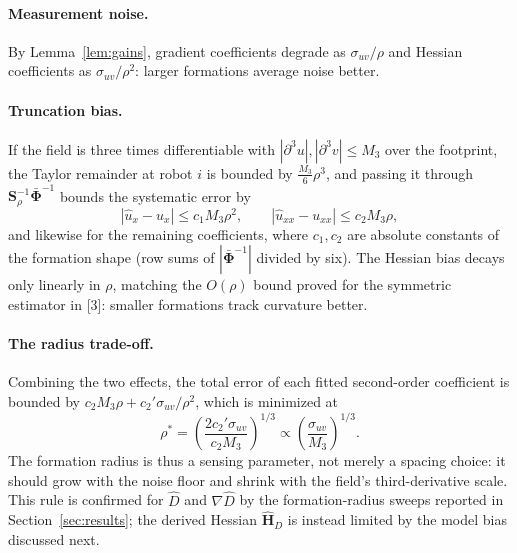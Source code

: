 \documentclass[12pt, letterpaper, oneside]{report}
\begin{document}
\paragraph{Measurement noise.} By Lemma~\ref{lem:gains}, gradient
coefficients degrade as $\sigma_{uv}/\rho$ and Hessian coefficients as
$\sigma_{uv}/\rho^2$: larger formations average noise better.

\paragraph{Truncation bias.} If the field is three times differentiable
with $|\partial^3u|,|\partial^3v|\leq M_3$ over the footprint, the Taylor
remainder at robot $i$ is bounded by $\tfrac{M_3}{6}\rho^3$, and passing it
through $\mathbf{S}_\rho^{-1}\bar{\boldsymbol{\Phi}}^{-1}$ bounds the
systematic error by
\begin{equation}
|\hat u_x - u_x| \leq c_1M_3\rho^2, \qquad |\hat u_{xx}-u_{xx}| \leq c_2M_3\rho,
\label{eq:truncation}
\end{equation}
and likewise for the remaining coefficients, where $c_1,c_2$ are absolute
constants of the formation shape (row sums of $|\bar{\boldsymbol{\Phi}}^{-1}|$
divided by six). The Hessian bias decays only linearly in $\rho$, matching
the $O(\rho)$ bound proved for the symmetric estimator in [3]: smaller
formations track curvature better.

\paragraph{The radius trade-off.} Combining the two effects, the total
error of each fitted second-order coefficient is bounded by
$c_2M_3\rho + c_2'\sigma_{uv}/\rho^2$, which is minimized at
\begin{equation}
\rho^* = \left(\frac{2c_2'\sigma_{uv}}{c_2M_3}\right)^{1/3} \propto \left(\frac{\sigma_{uv}}{M_3}\right)^{1/3}.
\label{eq:rho_star}
\end{equation}
The formation radius is thus a sensing parameter, not merely a spacing
choice: it should grow with the noise floor and shrink with the field's
third-derivative scale. This rule is confirmed for $\hat D$ and
$\nabla\hat D$ by the formation-radius sweeps reported in
Section~\ref{sec:results}; the derived Hessian $\hat{\mathbf{H}}_D$ is
instead limited by the model bias discussed next.
\end{document}
